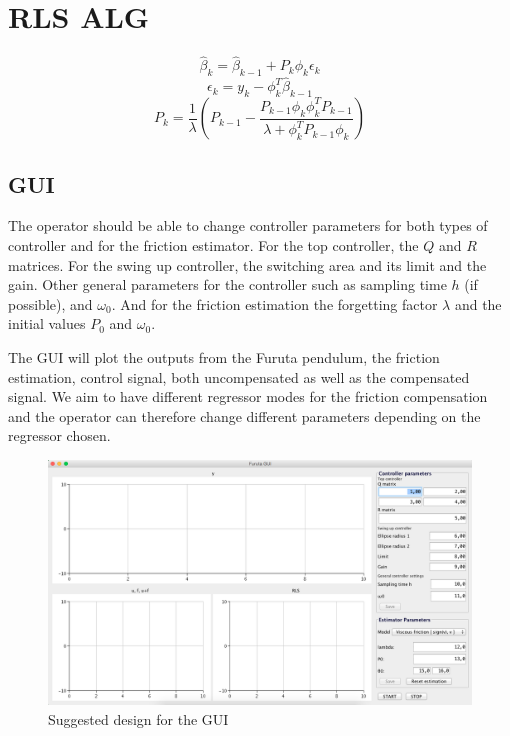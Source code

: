 \documentclass[10pt,a4paper]{article}
\begin{document}
\section{RLS ALG}

\begin{equation}
\hat{\beta}_k = \hat{\beta}_{k-1}+P_k\phi_k\epsilon_k 
\end{equation}
\begin{equation}
\epsilon_k=y_k-\phi_k^{T}\hat{\beta}_{k-1} 
\end{equation}
\begin{equation}
P_k=\frac{1}{\lambda}(P_{k-1}-\frac{P_{k-1}\phi_k\phi_k^{T}P_{k-1}}{\lambda+\phi_k^{T}P_{k-1}\phi_k})
\end{equation}

\subsection{GUI}
The operator should be able to change controller parameters for both types of controller and for the friction estimator. For the top controller, the $Q$ and $R$ matrices. For the swing up controller, the switching area and its limit and the gain. Other general parameters for the controller such as sampling time $h$ (if possible), and $\omega _0$. And for the friction estimation the forgetting factor $\lambda$ and the initial values $P_0$ and $\omega _0$.

The GUI will plot the outputs from the Furuta pendulum, the friction estimation, control signal, both uncompensated as well as the compensated signal. We aim to have different regressor modes for the friction compensation and the operator can therefore change different parameters depending on the regressor chosen. 
\begin{figure}[H]
\centerline{\includegraphics[scale=0.4]{gui.png}}
\caption{Suggested design for the GUI}
\label{fig:uml}
\end{figure}
\end{document}

